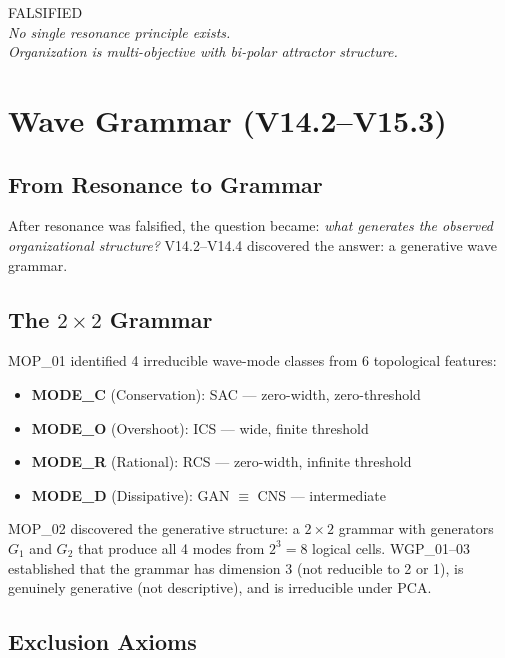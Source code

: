 \documentclass[11pt,a4paper,oneside]{report}
\newcommand{\falsified}{\textcolor{falsified}{FALSIFIED}}
\begin{document}
\begin{center}
\falsified{}\\[4pt]
\textit{No single resonance principle exists.}\\[2pt]
\textit{Organization is multi-objective with bi-polar attractor structure.}
\end{center}

\section{Wave Grammar (V14.2--V15.3)}\label{sec:grammar}

\subsection{From Resonance to Grammar}

After resonance was falsified, the question became: \textit{what generates
the observed organizational structure?} V14.2--V14.4 discovered the answer:
a generative wave grammar.

\subsection{The $2\times 2$ Grammar}

MOP\_01 identified 4 irreducible wave-mode classes from 6 topological features:
\begin{itemize}[nosep]
  \item \textbf{MODE\_C} (Conservation): SAC --- zero-width, zero-threshold
  \item \textbf{MODE\_O} (Overshoot): ICS --- wide, finite threshold
  \item \textbf{MODE\_R} (Rational): RCS --- zero-width, infinite threshold
  \item \textbf{MODE\_D} (Dissipative): GAN $\equiv$ CNS --- intermediate
\end{itemize}

MOP\_02 discovered the generative structure: a $2\times 2$ grammar with
generators $G_1$ and $G_2$ that produce all 4 modes from $2^3 = 8$ logical
cells. WGP\_01--03 established that the grammar has dimension 3 (not reducible
to 2 or 1), is genuinely generative (not descriptive), and is irreducible
under PCA.

\subsection{Exclusion Axioms}
\end{document}
